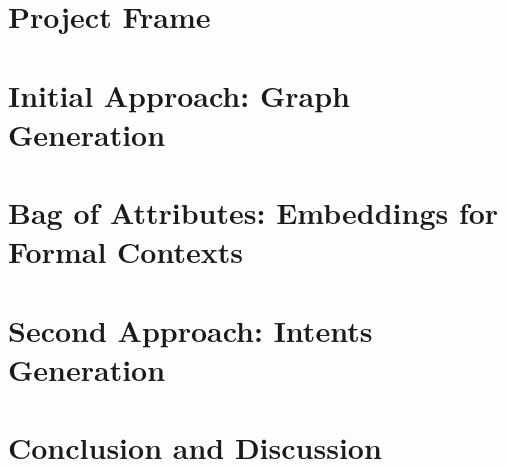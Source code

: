 \newcommand{\eg}{\emph{e.g.}}
\newcommand{\ie}{\emph{i.e.}}
\newcommand{\soa}{state-of-the-art}
\newcommand{\Soa}{State-of-the-art}
\newcommand{\etal}{\emph{et al.}}
\newcommand{\etc}{\emph{etc.}}

\chapter{Project Frame\label{ch:frame}}






\chapter{Initial Approach: Graph Generation\label{ch:graph}}






\chapter{Bag of Attributes: Embeddings for Formal Contexts\label{ch:boa}}






\chapter{Second Approach: Intents Generation\label{ch:intents}}






\chapter{Conclusion and Discussion\label{ch:ccl}}


%
%


\printbibliography[heading=bibintoc]




